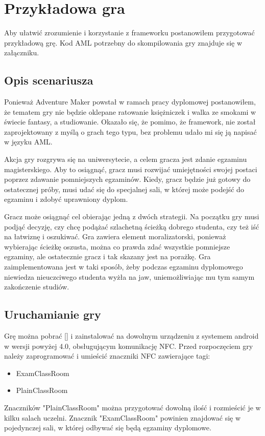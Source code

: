 \documentclass	{xmgr}
\begin{document}
\chapter{Przykładowa gra}
Aby ułatwić zrozumienie i korzystanie z frameworku postanowiłem przygotować przykładową grę. Kod AML potrzebny do skompilowania gry znajduje się w załączniku.

\section{Opis scenariusza}

Ponieważ Adventure Maker powstał w ramach pracy dyplomowej postanowiłem, że tematem gry nie będzie oklepane ratowanie księżniczek i walka ze smokami w świecie fantasy, a studiowanie. Okazało się, że pomimo, że framework, nie został zaprojektowany z myślą o grach tego typu, bez problemu udało mi się ją napisać w języku AML.

Akcja gry rozgrywa się na uniwersytecie, a celem gracza jest zdanie egzaminu magisterskiego. Aby to osiągnąć, gracz musi rozwijać umiejętności swojej postaci poprzez zdawanie pomniejszych egzaminów. Kiedy, gracz będzie już gotowy do ostatecznej próby, musi udać się do specjalnej sali, w której może podejść do egzaminu i zdobyć uprawniony dyplom.

Gracz może osiągnąć cel obierając jedną z dwóch strategii. Na początku gry musi podjąć decyzję, czy chcę podążać szlachetną ścieżką dobrego studenta, czy też iść na łatwiznę i oszukiwać. Gra zawiera element moralizatorski, ponieważ wybierając ścieżkę oszusta, można co prawda zdać wszystkie pomniejsze egzaminy, ale ostatecznie gracz i tak skazany jest na porażkę. Gra zaimplementowana jest w taki sposób, żeby podczas egzaminu dyplomowego niewiedza nieuczciwego studenta wyżła na jaw, uniemożliwiając mu tym samym zakończenie studiów.

\section{Uruchamianie gry}

Grę można pobrać [] i zainstalować na dowolnym urządzeniu z systemem android w wersji powyżej 4.0, obsługującym komunikację NFC. Przed rozpoczęciem gry należy zaprogramować i umieścić znaczniki NFC zawierające tagi:
\begin{itemize}
	\item ExamClassRoom
	\item PlainClassRoom
\end{itemize}
Znaczników "PlainClassRoom" można przygotować dowolną ilość i rozmieścić je w kilku salach uczelni. Znacznik "ExamClassRoom" powinien znajdować się w pojedynczej sali, w której odbywać się będą egzaminy dyplomowe.
\end{document}
